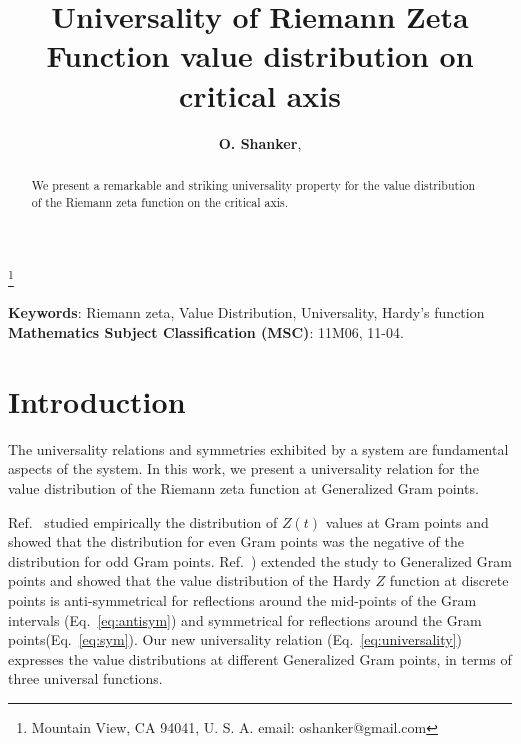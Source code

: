 \documentclass[twoside]{article}
\begin{document}


\newtheorem{theorem}{Theorem}[section]
\newtheorem{lemma}[theorem]{Lemma}

\theoremstyle{definition}
\newtheorem{definition}[theorem]{Definition}
\newtheorem{example}[theorem]{Example}
\newtheorem{xca}[theorem]{Exercise}

\theoremstyle{remark}
\newtheorem{remark}[theorem]{Remark}



\date{}
\lhead[]{}
\rhead[]{}

\title{\bf{Universality of Riemann Zeta Function value distribution on critical axis}}

\maketitle


\author{{\textbf{O. Shanker}},}
\thanks{ Mountain View, CA 94041, U. S. A. email: oshanker@gmail.com}

\thispagestyle{fancy}

\begin{abstract}
We present a remarkable and striking universality property for the value distribution
of the Riemann zeta function on the critical axis.

\end{abstract}
{\textbf {Keywords}:} Riemann zeta, Value Distribution, Universality, Hardy's function
{\textbf {Mathematics Subject Classification (MSC)}:} 11M06, 11-04.


\symbolfootnote[0]{\bf{* }}


\section{Introduction}

The universality relations and symmetries exhibited by a system are fundamental aspects of the system. 
In this work, we present a universality relation for the value
distribution of the Riemann zeta function at Generalized Gram points.

Ref.~\cite{Shanker 2018a} studied empirically the distribution of $Z(t)$ values at Gram points and
showed  that the distribution for even Gram points was the negative  of the distribution for odd Gram points. 
Ref.~\cite{Shanker 2018b}) extended the study to Generalized Gram points and showed 
that the  value
distribution of the Hardy $Z$ function at discrete points is anti-symmetrical for reflections around the mid-points 
of 
the Gram intervals (Eq.~\ref{eq:antisym}) and symmetrical for reflections around the Gram points(Eq.~\ref{eq:sym}). 
Our new universality relation (Eq.~\ref{eq:universality}) expresses the value distributions 
at different Generalized Gram points, in terms of three universal functions.
\end{document}
